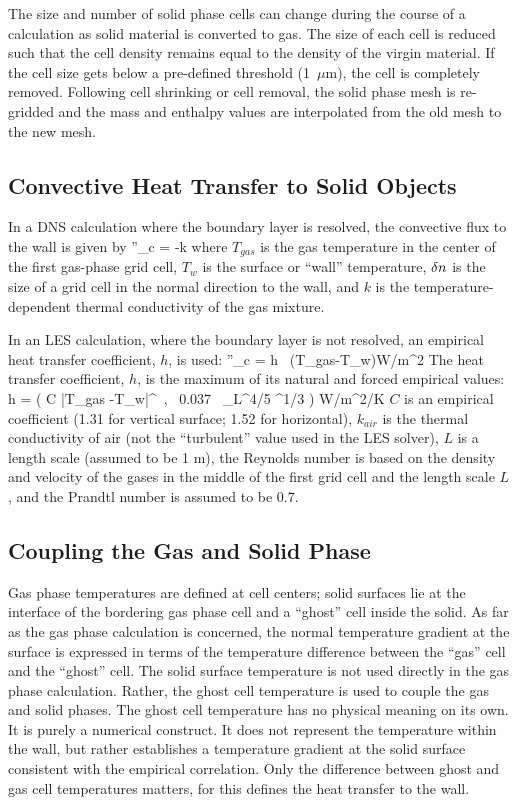 \documentclass[11pt]{book}
\begin{document}
The size and number of solid phase cells
can change during the course of a calculation as solid material is converted to gas. The size of each cell is reduced such that the cell density remains
equal to the density of the virgin material.
If the cell size gets below a pre-defined threshold (1~$\mu$m), the cell is completely removed.
Following cell shrinking or cell removal, the solid phase mesh is re-gridded and the mass and enthalpy values are interpolated from the old mesh to the new mesh.



\subsection{Convective Heat Transfer to Solid Objects}

In a DNS calculation where the boundary layer is resolved, the convective flux to the wall
is given by
\be
\dq''_c = -k 
\ee
where $T_{gas}$ is the gas temperature in the center of the first gas-phase grid cell,
$T_w$ is the surface or ``wall'' temperature, $\delta n$ is the
size of a grid cell in the normal direction to the wall, and $k$ is
the temperature-dependent thermal conductivity of the gas mixture.

In an LES calculation, where the boundary layer is not resolved, an empirical heat transfer coefficient, $h$, is used: \be \dq''_c = h \,
(T_{gas}-T_w)\quad \hbox{W/m}^2 \ee The heat transfer coefficient, $h$, is the maximum of its natural and forced empirical values:
 \be h = \max \left( C |T_{gas} -T_w|^\ot \, , \,  0.037 \, \RE_L^{4/5} \PR^{1/3} \right)  \quad \hbox{W/m}^2\hbox{/K}  \ee
$C$ is an empirical coefficient (1.31 for vertical surface; 1.52 for horizontal), $k_{air}$ is
the thermal conductivity of air (not the ``turbulent''
value used in the LES solver), $L$ is a length scale (assumed to be 1 m), the Reynolds number
is based on the density and velocity of the gases in
the middle of the first grid cell and the length scale $L$, and the Prandtl number is assumed to be 0.7.


\subsection{Coupling the Gas and Solid Phase}

Gas phase temperatures are defined at cell centers; solid surfaces lie at the
interface of the bordering gas phase cell and a ``ghost'' cell inside the
solid. As far as the gas phase calculation is concerned,
the normal temperature gradient at the surface is expressed in terms of
the temperature difference between the ``gas'' cell and the ``ghost'' cell.
The solid surface temperature is not used directly in the gas phase calculation.
Rather, the ghost cell temperature is used to couple the gas and solid phases.
The ghost cell temperature
has no physical meaning on its own. It is purely a numerical construct. It does
not represent the temperature within the wall, but rather establishes
a temperature gradient at the solid surface consistent with the empirical
correlation. Only the difference between ghost and
gas cell temperatures matters, for this defines the heat transfer to the
wall.
\end{document}
